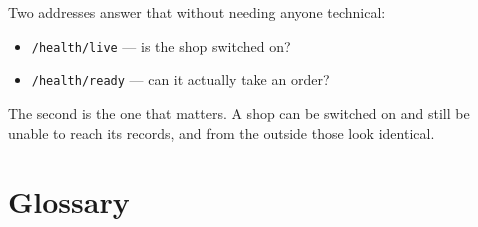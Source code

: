 \documentclass[11pt,a4paper]{report}
\begin{document}
Two addresses answer that without needing anyone technical:

\begin{itemize}
  \item \texttt{/health/live} --- is the shop switched on?
  \item \texttt{/health/ready} --- can it actually take an order?
\end{itemize}

The second is the one that matters. A shop can be switched on and still
be unable to reach its records, and from the outside those look
identical.

\appendix

\chapter{Glossary}
\end{document}
